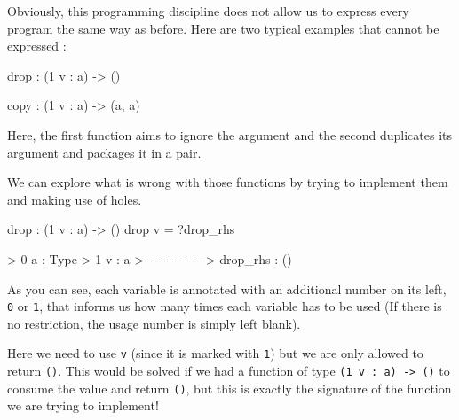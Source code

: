 \documentclass[
]{article}
\newenvironment{Shaded}{}{}
\newcommand{\CommentTok}[1]{\textcolor[rgb]{0.38,0.63,0.69}{\textit{#1}}}
\newcommand{\DataTypeTok}[1]{\textcolor[rgb]{0.56,0.13,0.00}{#1}}
\newcommand{\DecValTok}[1]{\textcolor[rgb]{0.25,0.63,0.44}{#1}}
\newcommand{\FunctionTok}[1]{\textcolor[rgb]{0.02,0.16,0.49}{#1}}
\newcommand{\NormalTok}[1]{#1}
\newcommand{\OperatorTok}[1]{\textcolor[rgb]{0.40,0.40,0.40}{#1}}
\newcommand{\OtherTok}[1]{\textcolor[rgb]{0.00,0.44,0.13}{#1}}
\begin{document}
Obviously, this programming discipline does not allow us to express
every program the same way as before. Here are two typical examples that
cannot be expressed :

\begin{Shaded}
\begin{Highlighting}[]
\FunctionTok{drop} \OperatorTok{:}\NormalTok{ (}\DecValTok{1}\NormalTok{ v }\OperatorTok{:}\NormalTok{ a) }\OtherTok{{-}\textgreater{}}\NormalTok{ ()}

\NormalTok{copy }\OperatorTok{:}\NormalTok{ (}\DecValTok{1}\NormalTok{ v }\OperatorTok{:}\NormalTok{ a) }\OtherTok{{-}\textgreater{}}\NormalTok{ (a, a)}
\end{Highlighting}
\end{Shaded}

Here, the first function aims to ignore the argument and the second
duplicates its argument and packages it in a pair.

We can explore what is wrong with those functions by trying to implement
them and making use of holes.

\begin{Shaded}
\begin{Highlighting}[]
\FunctionTok{drop} \OperatorTok{:}\NormalTok{ (}\DecValTok{1}\NormalTok{ v }\OperatorTok{:}\NormalTok{ a) }\OtherTok{{-}\textgreater{}}\NormalTok{ ()}
\FunctionTok{drop}\NormalTok{ v }\OtherTok{=} \OperatorTok{?}\NormalTok{drop\_rhs}
\end{Highlighting}
\end{Shaded}

\begin{Shaded}
\begin{Highlighting}[]
\OperatorTok{\textgreater{}} \DecValTok{0}\NormalTok{ a }\OperatorTok{:} \DataTypeTok{Type}
\OperatorTok{\textgreater{}} \DecValTok{1}\NormalTok{ v }\OperatorTok{:}\NormalTok{ a}
\OperatorTok{\textgreater{}} \CommentTok{{-}{-}{-}{-}{-}{-}{-}{-}{-}{-}{-}{-}}
\OperatorTok{\textgreater{}}\NormalTok{ drop\_rhs }\OperatorTok{:}\NormalTok{ ()}
\end{Highlighting}
\end{Shaded}

As you can see, each variable is annotated with an additional number on
its left, \texttt{0} or \texttt{1}, that informs us how many times each
variable has to be used (If there is no restriction, the usage number is
simply left blank).

Here we need to use \texttt{v} (since it is marked with \texttt{1}) but
we are only allowed to return \texttt{()}. This would be solved if we
had a function of type \texttt{(1\ v\ :\ a)\ -\textgreater{}\ ()} to
consume the value and return \texttt{()}, but this is exactly the
signature of the function we are trying to implement!
\end{document}
